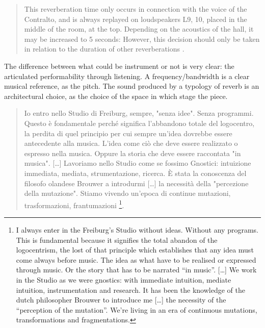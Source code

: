 \documentclass[twoside,a4paper]{article}
\begin{document}
\begin{quote}
This reverberation time only occurs in connection with the voice of the Contralto, and is always replayed on loudspeakers L9, 10, placed in the middle of the room, at the top. Depending on the acoustics of the hall, it may be increased to 5 seconds: However, this decision should only be taken in relation to the duration of other reverberations \cite{nlre87}.
\end{quote}

The difference between what could be instrument or not is very clear: the articulated performability through listening. A frequency/bandwidth is a clear musical reference, as the pitch. The sound produced by a typology of reverb is an architectural choice, as the choice of the space in which stage the piece. 

\begin{quote}
Io entro nello Studio di Freiburg, sempre, "senza idee". Senza programmi. Questo è fondamentale perché significa l'abbandono totale del logocentro, la perdita di quel principio per cui sempre un'idea dovrebbe essere antecedente alla musica. L'idea come ciò che deve essere realizzato o espresso nella musica. Oppure la storia che deve essere raccontata "in musica". [\ldots] %
Lavoriamo nello Studio come se fossimo Gnostici: intuizione immediata, mediata, strumentazione, ricerca. È stata la conoscenza del filosofo olandese Brouwer a introdurmi [\ldots] la necessità della "percezione della mutazione". Stiamo vivendo un'epoca di continue mutazioni, trasformazioni, frantumazioni \cite{nono85}\footnote{I always enter in the Freiburg’s Studio without ideas. Without any programs. This is fundamental because it signifies the total abandon of the logocentrism, the lost of that principle which establishes that any idea must come always before music. The idea as what have to be realised or expressed through music. Or the story that has to be narrated “in music”. [\dots] We work in the Studio as we were gnostics: with immediate intuition, mediate intuition, instrumentation and research. It has been the knowledge of the dutch philosopher Brouwer to introduce me [\dots] the necessity of the “perception of the mutation”. We’re living in an era of continuous mutations, transformations and fragmentations.}. 
\end{quote}
\end{document}
